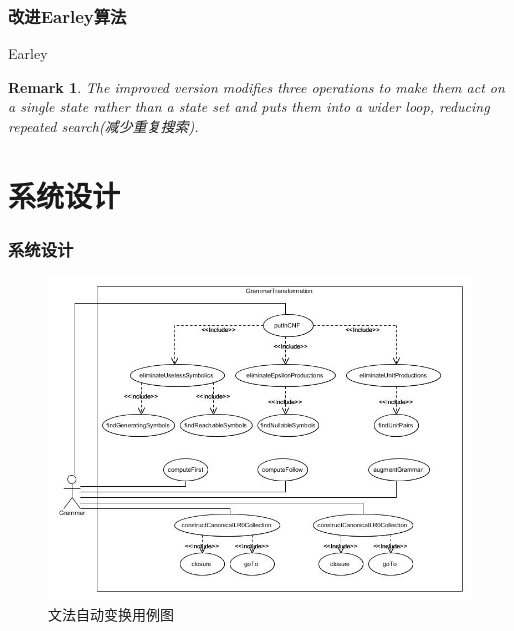 \documentclass{beamer}
\newtheorem{remark}[theorem]{Remark}
\begin{document}
\begin{frame}
\frametitle{改进Earley算法}
\begin{algorithm}[H]
\caption{Earley}
\label{fig: earley}

\begin{algorithmic}[1]

\ELSE
{}
\ENDIF
\ELSE
{}
\ENDIF
\ENDFOR
\ENDFOR
\end{algorithmic}
\end{algorithm}
\end{frame}

\begin{frame}
\begin{remark}
The improved version modifies three operations to make them act on a single state rather than a state set and puts them into a wider loop, reducing repeated search(减少重复搜索).
\end{remark}
\end{frame}

\section{系统设计}
 \begin{frame}
 \frametitle{系统设计}
\begin{figure}
\includegraphics[height=0.75\textheight]{GrammarTransformation.jpg}
\caption{文法自动变换用例图}
\label{fig: gt}
\end{figure}
 \end{frame}
 
\end{document}
